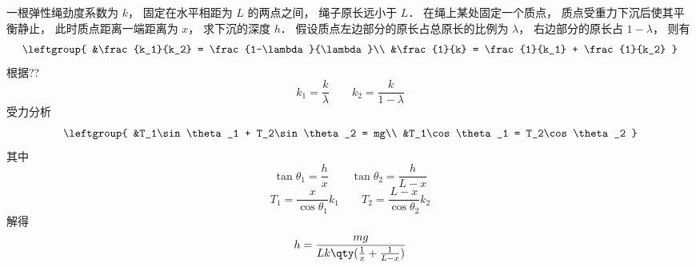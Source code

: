 \begin{example}{}
一根弹性绳劲度系数为 $k$， 固定在水平相距为 $L$ 的两点之间， 绳子原长远小于 $L$． 在绳上某处固定一个质点， 质点受重力下沉后使其平衡静止， 此时质点距离一端距离为 $x$， 求下沉的深度 $h$．
假设质点左边部分的原长占总原长的比例为 $\lambda$， 右边部分的原长占 $1-\lambda$， 则有
\begin{equation}
\leftgroup{
&\frac{k_1}{k_2} = \frac{1-\lambda}{\lambda}\\
&\frac{1}{k} = \frac{1}{k_1} + \frac{1}{k_2}
}
\end{equation}
根据??
\begin{equation}
k_1 = \frac{k}{\lambda} \qquad
k_2 = \frac{k}{1-\lambda}
\end{equation}
受力分析
\begin{equation}
\leftgroup{
&T_1\sin\theta_1 + T_2\sin\theta_2 = mg\\
&T_1\cos\theta_1 = T_2\cos\theta_2
}
\end{equation}
其中
\begin{equation}
\tan\theta_1 = \frac{h}{x}
\qquad
\tan\theta_2 = \frac{h}{L-x}
\end{equation}
\begin{equation}
T_1 = \frac{x}{\cos\theta_1} k_1 \qquad
T_2 = \frac{L-x}{\cos\theta_2} k_2
\end{equation}
解得
\begin{equation}
h = \frac{mg}{Lk\qty(\frac{1}{x} + \frac{1}{L-x})}
\end{equation}
\end{example}
